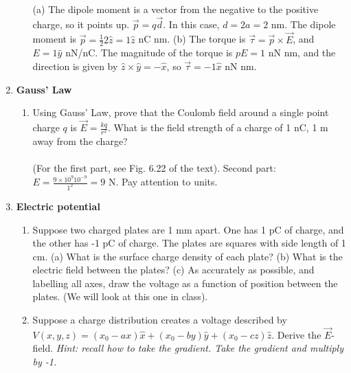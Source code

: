 \documentclass[10pt]{article}
\begin{document}
\begin{enumerate}
\begin{enumerate}
(a) The dipole moment is a vector from the negative to the positive charge, so it points up.  $\vec{p} = q \vec{d}$.  In this case, $d = 2a = 2$ nm.  The dipole moment is $\vec{p} = \frac{1}{2} 2 \hat{z} = 1 \hat{z}$ nC nm. (b) The torque is $\vec{\tau} = \vec{p} \times \vec{E}$, and $E = 1 \hat{y}$ nN/nC.  The magnitude of the torque is $pE = 1$ nN nm, and the direction is given by $\hat{z} \times \hat{y} = -\hat{x}$, so $\vec{\tau} = -1 \hat{x}$ nN nm.
\end{enumerate}
\item \textbf{Gauss' Law}
\begin{enumerate}
\item Using Gauss' Law, prove that the Coulomb field around a single point charge $q$ is $\vec{E} = \frac{k q}{r^2}$.  What is the field strength of a charge of 1 nC, 1 m away from the charge? \\ \\
(For the first part, see Fig. 6.22 of the text).  Second part: $E = \frac{9 \times 10^9 10^{-9}}{1^2} = 9$ N.  Pay attention to units.
\end{enumerate}
\item \textbf{Electric potential}
\begin{enumerate}
\item Suppose two charged plates are 1 mm apart.  One has 1 pC of charge, and the other has -1 pC of charge.  The plates are squares with side length of 1 cm.  (a) What is the surface charge density of each plate?  (b) What is the electric field between the plates?  (c) As accurately as possible, and labelling all axes, draw the voltage as a function of position between the plates.  (We will look at this one in class).
\item Suppose a charge distribution creates a voltage described by $V(x,y,z) = (x_0 - a x) \hat{x} + (x_0 - b y) \hat{y} + (x_0 - c z) \hat{z}$.  Derive the $\vec{E}$-field.  \textit{Hint: recall how to take the gradient.  Take the gradient and multiply by -1.}
\end{enumerate}
\end{enumerate}
\end{document}
